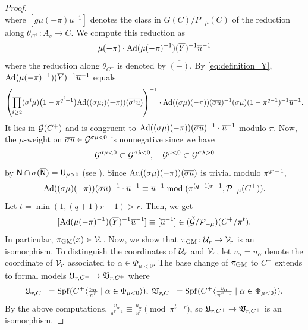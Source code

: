 \documentclass[12pt,reqno]{amsart}
\begin{document}
\begin{proof}
\[    \]
    where $[g \mu(-\pi) u^{-1}]$ denotes the class in $G(C) / P_{-\mu}(C)$ of the reduction along $\theta_{C^+} \colon A_s \to C$. We compute this reduction as 
    \[
        \mu(-\pi) \cdot {\operatorname{Ad}}(\mu(-\pi)^{-1})({\overline{Y}})^{-1} {\overline{u}}^{-1}
    \]
    where the reduction along $\theta_{C^+}$ is denoted by $\overline{(-)}$. By \eqref{eq:definition_Y}, ${\operatorname{Ad}}(\mu(-\pi)^{-1})({\overline{Y}})^{-1} {\overline{u}}^{-1}$ equals
    \[
        \left( \prod_{i \geq 2} (\sigma^i\mu)\bigl(1 - \pi^{q^i-1}\bigr) {\operatorname{Ad}}((\sigma\mu_{i})(-\pi))({\overline{\sigma^iu}}) \right)^{-1} \cdot {\operatorname{Ad}}((\sigma\mu)(-\pi))({\overline{\sigma u}})^{-1} (\sigma \mu)(1 - \pi^{q-1})^{-1} {\overline{u}}^{-1}. 
    \]
    It lies in ${\mathcal{G}}(C^+)$ and is congruent to ${\operatorname{Ad}}((\sigma\mu)(-\pi))({\overline{\sigma u}})^{-1} \cdot {\overline{u}}^{-1}$ modulo $\pi$. Now, the $\mu$-weight on ${\overline{\sigma u}} \in {\mathcal{G}}^{\sigma \mu < 0}$ is nonnegative since we have
    \[
        {\mathcal{G}}^{\sigma \mu < 0} \subset {\mathcal{G}}^{\sigma \lambda < 0} ,\quad 
        {\mathcal{G}}^{\mu < 0} \subset {\mathcal{G}}^{\sigma \lambda > 0}
    \]
    by ${\mathsf{N}} \cap \sigma({\overline{{\mathsf{N}}}}) = {\mathsf{U}}_{\mu > 0}$ (see ). Since ${\operatorname{Ad}}((\sigma\mu)(-\pi))({\overline{\sigma u}})$ is trivial modulo $\pi^{qr - 1}$, 
    \[
        {\operatorname{Ad}}((\sigma\mu)(-\pi))({\overline{\sigma u}})^{-1} \cdot {\overline{u}}^{-1} \equiv {\overline{u}}^{-1} \bmod{(\pi^{(q + 1) r - 1}, {\mathcal{P}}_{-\mu}(C^+))}. 
    \]
    Let $t = \min(1, (q + 1) r - 1) > r$. Then, we get
    \[
        [{\operatorname{Ad}}(\mu(-\pi)^{-1})({\overline{Y}})^{-1} {\overline{u}}^{-1}] \equiv [{\overline{u}}^{-1}] \in ({\mathcal{\breve{G}}} / {\mathcal{P}}_{-\mu})(C^+ / \pi^t). 
    \]
    In particular, $\pi_{\operatorname{GM}}(x) \in {\mathcal{V}}_r$. Now, we show that $\pi_{\operatorname{GM}} \colon {\mathcal{U}}_r \to {\mathcal{V}}_r$ is an isomorphism. To distinguish the coordinates of ${\mathcal{U}}_r$ and ${\mathcal{V}}_r$, let $v_\alpha = u_\alpha$ denote the coordinate of ${\mathcal{V}}_r$ associated to $\alpha \in \Phi_{\mu < 0}$. The base change of $\pi_{{\operatorname{GM}}}$ to $C^+$ extends to formal models ${\mathfrak{U}}_{r, C^+} \to {\mathfrak{V}}_{r, C^+}$ where
    \[
        {\mathfrak{U}}_{r, C^+} = {\operatorname{Spf}}(C^+\langle \tfrac{u_\alpha}{\pi^r} \mid \alpha \in \Phi_{\mu < 0} \rangle), \;
        {\mathfrak{V}}_{r, C^+} = {\operatorname{Spf}}(C^+\langle \tfrac{v_\alpha}{\pi^{r - 1}} \mid \alpha \in \Phi_{\mu < 0} \rangle). 
    \]
    By the above computations, $\tfrac{v_\alpha}{\pi^{r - 1}} \equiv \tfrac{u_\alpha}{\pi^r} \pmod{\pi^{t - r}}$, so ${\mathfrak{U}}_{r, C^+} \to {\mathfrak{V}}_{r, C^+}$ is an isomorphism. 


\end{proof}
\end{document}
